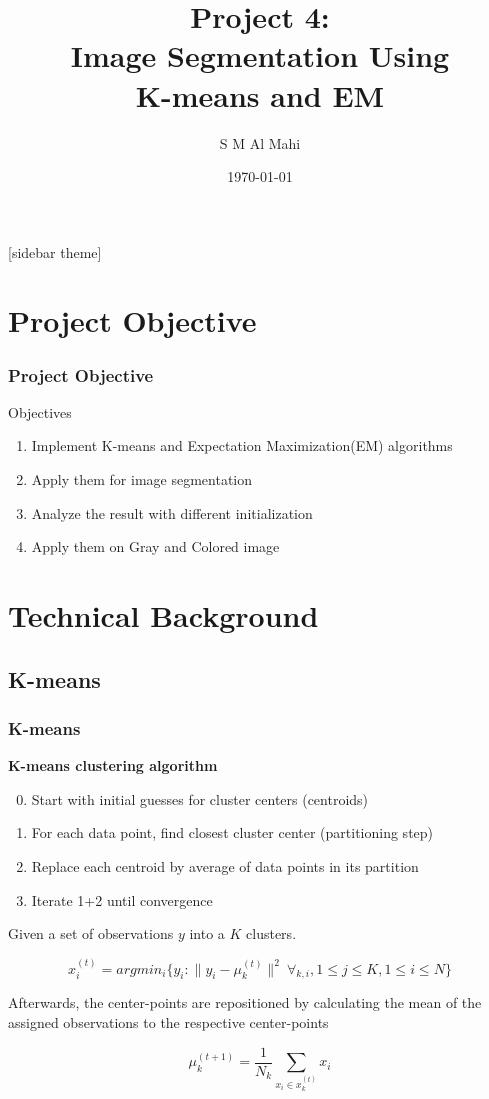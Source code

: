 \documentclass[11pt]{beamer}
\author{S M Al Mahi}
\title[ECEN-5283 Computer Vision]{Project 4: \\Image Segmentation Using\\K-means and EM}
\institute{Oklahoma State University}
\date{\today}
\begin{document}
\begin{frame}
\titlepage
\end{frame}

\newpage
{}[sidebar theme]
\section{Project Objective}
\begin{frame}
\frametitle{Project Objective}
	\begin{block}{Objectives}
	\begin{enumerate}
		\item Implement K-means and Expectation Maximization(EM) algorithms
		\item Apply them for image segmentation 
		\item Analyze the result with different initialization
		\item Apply them on Gray and Colored image
	\end{enumerate}
	\end{block}
\end{frame}

\section{Technical Background}
\subsection{K-means}
\begin{frame}
\frametitle{K-means}
{\bf K-means clustering algorithm}

\begin{enumerate}

\setcounter{enumi}{-1}

\item Start with initial guesses for cluster centers (centroids)
\item For each data point, find closest cluster center (partitioning step)
\item Replace each centroid by average of data points in its partition
\item Iterate 1+2 until convergence

\end{enumerate}

\end{frame}
\begin{frame}
Given a set of observations $y$ into a $K$ clusters. 

\[
x_i^{(t)} = argmin_i \big \{ y_i : \big \| y_i - \mu^{(t)}_k \big \|^2  \ \forall_{k,i}, 1 \le j \le K, 1 \le i \le N \big\}
\label{eqn:kmeans_assign_step}
\]

Afterwards, the center-points are repositioned by calculating the mean of the assigned observations to the respective center-points

\[
\mu^{(t+1)}_k = \frac{1}{N_k} \sum_{x_i \in x^{(t)}_k} x_i
\]


\end{frame}
\end{document}
